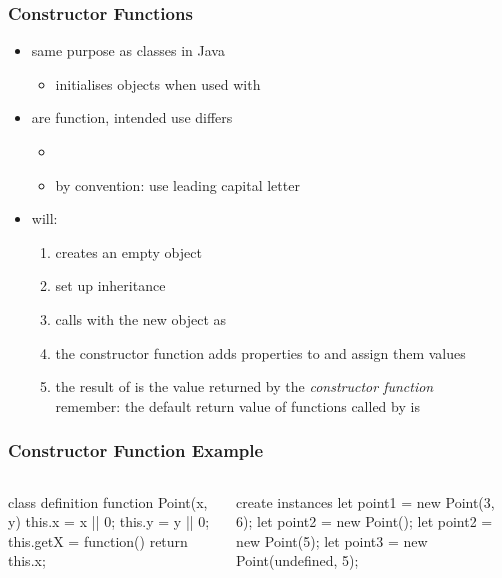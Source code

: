 \begin{frame}[fragile] \frametitle{Constructor Functions}

\begin{itemize}
  \item same purpose as classes in Java
  \begin{itemize}
    \item initialises objects when used with 
  \end{itemize}
  \item are	 function, intended use differs
  \begin{itemize}
    \item {}
    \item by convention: use leading capital letter
  \end{itemize}
  \item {} will:
  \begin{enumerate}
    \item creates an empty object
    \item set up inheritance
    \item calls  with the new object as 
    \item the constructor function adds properties to  and assign them values
    \item the result of  is the value returned by the \emph{constructor function}\\
             remember: the default return value of functions called by  is 
  \end{enumerate}
\end{itemize}
\end{frame}

\begin{frame}[fragile] \frametitle{Constructor Function Example}

\begin{columns}[onlytextwidth]
  \begin{column}{0.5\textwidth}
\begin{CodeBox}{class definition}
function Point(x, y) {
  this.x = x || 0;
  this.y = y || 0;
  this.getX = function() {
    return this.x;
  }
}
\end{CodeBox}
  \end{column}
  \begin{column}{0.5\textwidth}
\begin{CodeBox}{create instances}
let point1 = new Point(3, 6);
let point2 = new Point();
let point2 = new Point(5);
let point3 = 
  new Point(undefined, 5);
\end{CodeBox}
  \end{column}
\end{columns}%
\end{frame}

